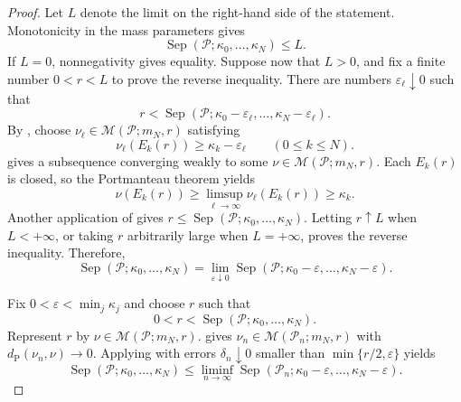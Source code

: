\documentclass{amsart}
\theoremstyle{plain}
\theoremstyle{definition}
\theoremstyle{remark}
\newcommand{\M}{\mathcal{M}}
\newcommand{\dpr}{d_{\operatorname{P}}}
\begin{document}
\begin{proof}
Let $L$ denote the limit on the right-hand side of the statement. Monotonicity in the
mass parameters gives
\[
\operatorname{Sep}(\mathcal P;\kappa_0,\ldots,\kappa_N)\leq L.
\]
If $L=0$, nonnegativity gives equality. Suppose now that $L>0$, and fix a
finite number $0<r<L$ to prove the reverse inequality. There are numbers
$\varepsilon_\ell\downarrow0$ such that
\[ r<\operatorname{Sep}(\mathcal P;\kappa_0-\varepsilon_\ell,\ldots, \kappa_N-\varepsilon_\ell). \]
By , choose
$\nu_\ell\in\M(\mathcal P;m_N,r)$ satisfying
\[ \nu_\ell(E_k(r))\geq\kappa_k-\varepsilon_\ell \qquad(0\leq k\leq N). \]
 gives a subsequence converging weakly
to some $\nu\in\M(\mathcal P;m_N,r)$. Each $E_k(r)$ is closed, so the
Portmanteau theorem yields
\[
\nu(E_k(r))\geq\limsup_{\ell\to\infty}\nu_\ell(E_k(r))\geq\kappa_k.
\]
Another application of
 gives
$r\leq\operatorname{Sep}(\mathcal P;\kappa_0,\ldots,\kappa_N)$. Letting
$r\uparrow L$ when $L<+\infty$, or taking $r$ arbitrarily large when
$L=+\infty$, proves the reverse inequality. Therefore,
\begin{equation}
\label{eq:pyramid-multi-directed-separation-right-continuity}
\operatorname{Sep}(\mathcal P;\kappa_0,\ldots,\kappa_N)
=\lim_{\varepsilon\downarrow0}
\operatorname{Sep}(\mathcal P;\kappa_0-\varepsilon,\ldots,
\kappa_N-\varepsilon).
\end{equation}

Fix $0<\varepsilon<\min_j\kappa_j$ and choose $r$ such that
\[
0<r<\operatorname{Sep}(\mathcal P;\kappa_0,\ldots,\kappa_N).
\]
Represent $r$ by $\nu\in\M(\mathcal P;m_N,r)$.
 gives
$\nu_n\in\M(\mathcal P_n;m_N,r)$ with $\dpr(\nu_n,\nu)\to0$.  Applying
 with errors
$\delta_n\downarrow0$ smaller than $\min\{r/2,\varepsilon\}$ yields
\begin{equation}
\label{eq:multi-directed-separation-limit-lower-squeeze}
\operatorname{Sep}(\mathcal P;\kappa_0,\ldots,\kappa_N)
\leq\liminf_{n\to\infty}
\operatorname{Sep}(\mathcal P_n;\kappa_0-\varepsilon,\ldots,
\kappa_N-\varepsilon).
\end{equation}


\end{proof}
\end{document}
